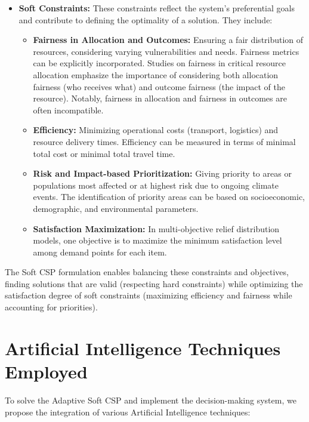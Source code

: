 \begin{itemize}
    \item \textbf{Soft Constraints:} These constraints reflect the system’s preferential goals and contribute to defining the optimality of a solution. They include:
    \begin{itemize}
        \item \textbf{Fairness in Allocation and Outcomes:} Ensuring a fair distribution of resources, considering varying vulnerabilities and needs. Fairness metrics can be explicitly incorporated. Studies on fairness in critical resource allocation emphasize the importance of considering both allocation fairness (who receives what) and outcome fairness (the impact of the resource). Notably, fairness in allocation and fairness in outcomes are often incompatible.
        \item \textbf{Efficiency:} Minimizing operational costs (transport, logistics) and resource delivery times. Efficiency can be measured in terms of minimal total cost or minimal total travel time.
        \item \textbf{Risk and Impact-based Prioritization:} Giving priority to areas or populations most affected or at highest risk due to ongoing climate events. The identification of priority areas can be based on socioeconomic, demographic, and environmental parameters.
        \item \textbf{Satisfaction Maximization:} In multi-objective relief distribution models, one objective is to maximize the minimum satisfaction level among demand points for each item.
    \end{itemize}
\end{itemize}

The Soft CSP formulation enables balancing these constraints and objectives, finding solutions that are valid (respecting hard constraints) while optimizing the satisfaction degree of soft constraints (maximizing efficiency and fairness while accounting for priorities).

\section{Artificial Intelligence Techniques Employed}
To solve the Adaptive Soft CSP and implement the decision-making system, we propose the integration of various Artificial Intelligence techniques:

